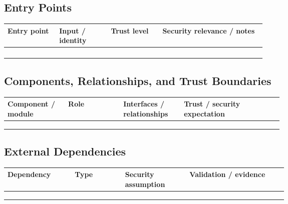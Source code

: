 \documentclass[10pt]{article}
\begin{document}
\subsection{Entry Points}
\par\smallskip\noindent\begin{tabularx}{\linewidth}{@{}L{0.20\linewidth}L{0.20\linewidth}L{0.20\linewidth}Y@{}}
\toprule
Entry point & Input / identity & Trust level & Security relevance / notes \\
\midrule
\rule{0pt}{2.6em} & & & \\
\rule{0pt}{2.6em} & & & \\
\rule{0pt}{2.6em} & & & \\
\rule{0pt}{2.6em} & & & \\
\bottomrule
\end{tabularx}

\subsection{Components, Relationships, and Trust Boundaries}
\par\smallskip\noindent\begin{tabularx}{\linewidth}{@{}L{0.22\linewidth}L{0.20\linewidth}L{0.22\linewidth}Y@{}}
\toprule
Component / module & Role & Interfaces / relationships & Trust / security expectation \\
\midrule
\rule{0pt}{2.8em} & & & \\
\rule{0pt}{2.8em} & & & \\
\rule{0pt}{2.8em} & & & \\
\bottomrule
\end{tabularx}

\subsection{External Dependencies}
\par\smallskip\noindent\begin{tabularx}{\linewidth}{@{}L{0.24\linewidth}L{0.18\linewidth}L{0.23\linewidth}Y@{}}
\toprule
Dependency & Type & Security assumption & Validation / evidence \\
\midrule
\rule{0pt}{2.7em} & & & \\
\rule{0pt}{2.7em} & & & \\
\rule{0pt}{2.7em} & & & \\
\bottomrule
\end{tabularx}
\end{document}
